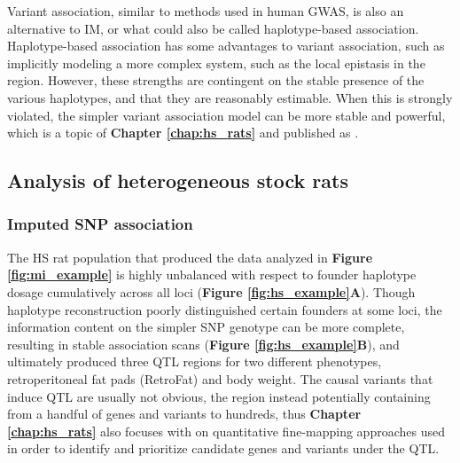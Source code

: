 Variant association, similar to methods used in human GWAS, is also an alternative to IM, or what could also be called haplotype-based association. Haplotype-based association has some advantages to variant association, such as implicitly modeling a more complex system, such as the local epistasis in the region. However, these strengths are contingent on the stable presence of the various haplotypes, and that they are reasonably estimable. When this is strongly violated, the simpler variant association model can be more stable and powerful, which is a topic of \textbf{Chapter \ref{chap:hs_rats}} and published as \cite{Keele2017}.

\subsection{Analysis of heterogeneous stock rats}

\subsubsection{Imputed SNP association}

The HS rat population that produced the data analyzed in \textbf{Figure \ref{fig:mi_example}} is highly unbalanced with respect to founder haplotype dosage cumulatively across all loci (\textbf{Figure \ref{fig:hs_example}A}). Though haplotype reconstruction poorly distinguished certain founders at some loci, the information content on the simpler SNP genotype can be more complete, resulting in stable association scans (\textbf{Figure \ref{fig:hs_example}B}), and ultimately produced three QTL regions for two different phenotypes, retroperitoneal fat pads (RetroFat) and body weight. The causal variants that induce QTL are usually not obvious, the region instead potentially containing from a handful of genes and variants to hundreds, thus \textbf{Chapter \ref{chap:hs_rats}} also focuses with on quantitative fine-mapping approaches used in order to identify and prioritize candidate genes and variants under the QTL.

